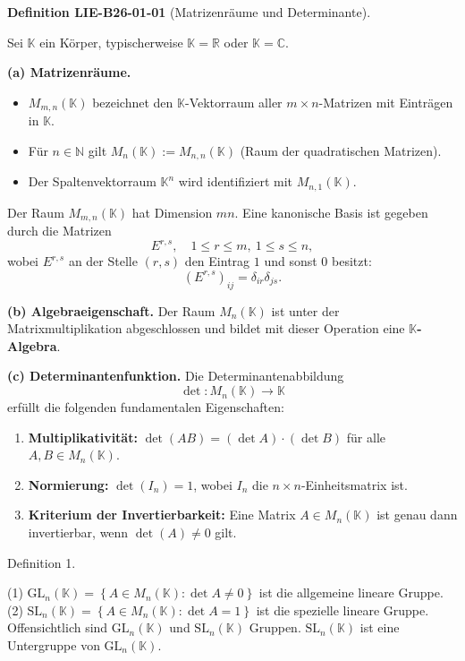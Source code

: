 \documentclass[10pt, letterpaper]{article}
\newcommand{\CustomHeading}[3]{%
  \par\medskip\noindent%
  \textbf{#1 #2} \textnormal{(#3)}.\enskip%
}
\newenvironment{DEF}[2]{\begin{unitbox}\CustomHeading{Definition}{#1}{#2}}{\end{unitbox}}
\begin{document}
\begin{DEF}{LIE-B26-01-01}{Matrizenräume und Determinante}
Sei $\mathbb{K}$ ein Körper, typischerweise $\mathbb{K}=\mathbb{R}$ oder $\mathbb{K}=\mathbb{C}$.  

\textbf{(a) Matrizenräume.}  
\begin{itemize}
  \item $M_{m,n}(\mathbb{K})$ bezeichnet den $\mathbb{K}$-Vektorraum aller $m\times n$-Matrizen mit Einträgen in $\mathbb{K}$.
  \item Für $n\in\mathbb{N}$ gilt $M_{n}(\mathbb{K}) := M_{n,n}(\mathbb{K})$ (Raum der quadratischen Matrizen).
  \item Der Spaltenvektorraum $\mathbb{K}^{n}$ wird identifiziert mit $M_{n,1}(\mathbb{K})$.
\end{itemize}
Der Raum $M_{m,n}(\mathbb{K})$ hat Dimension $mn$. Eine kanonische Basis ist gegeben durch die Matrizen
\[
E^{r,s},\quad 1\le r\le m,\ 1\le s\le n,
\]
wobei $E^{r,s}$ an der Stelle $(r,s)$ den Eintrag $1$ und sonst $0$ besitzt:
\[
(E^{r,s})_{ij} = \delta_{ir}\delta_{js}.
\]

\textbf{(b) Algebraeigenschaft.}  
Der Raum $M_{n}(\mathbb{K})$ ist unter der Matrixmultiplikation abgeschlossen und bildet mit dieser Operation eine \textbf{$\mathbb{K}$-Algebra}.

\textbf{(c) Determinantenfunktion.}  
Die Determinantenabbildung
\[
\det : M_{n}(\mathbb{K}) \longrightarrow \mathbb{K}
\]
erfüllt die folgenden fundamentalen Eigenschaften:
\begin{enumerate}
  \item \textbf{Multiplikativität:} $\det(AB) = (\det A)\cdot(\det B)$ für alle $A,B\in M_{n}(\mathbb{K})$.
  \item \textbf{Normierung:} $\det(I_n)=1$, wobei $I_n$ die $n\times n$-Einheitsmatrix ist.
  \item \textbf{Kriterium der Invertierbarkeit:}  
  Eine Matrix $A\in M_{n}(\mathbb{K})$ ist genau dann invertierbar, wenn $\det(A)\ne 0$ gilt.
\end{enumerate}
\end{DEF}


Definition 1. 

(1) $\mathrm{GL}_{n}(\mathbb{K})=\left\{A \in M_{n}(\mathbb{K}): \operatorname{det} A \neq 0\right\}$ ist die allgemeine lineare Gruppe.\\
(2) $\mathrm{SL}_{n}(\mathbb{K})=\left\{A \in M_{n}(\mathbb{K}): \operatorname{det} A=1\right\}$ ist die spezielle lineare Gruppe.\\
Offensichtlich sind $\mathrm{GL}_{n}(\mathbb{K})$ und $\mathrm{SL}_{n}(\mathbb{K})$ Gruppen. $\mathrm{SL}_{n}(\mathbb{K})$ ist eine Untergruppe von $\mathrm{GL}_{n}(\mathbb{K})$.
\end{document}
